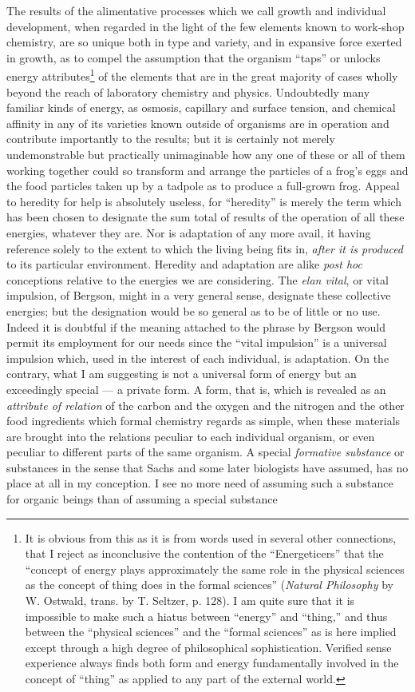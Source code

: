 \documentclass[a4paper, 11pt, oneside, polutonikogreek, english, landscape]{article}
\begin{document}
The results of the alimentative processes which we call growth and individual development, when regarded in the light of the few elements known to work-shop chemistry, are so unique both in type and variety, and in expansive force exerted in growth, as to compel the assumption that the organism ``taps'' or unlocks energy attributes\footnote{It is obvious from this as it is from words used in several other connections, that I reject as inconclusive the contention of the ``Energeticers'' that the ``concept of energy plays approximately the same role in the physical sciences as the concept of thing does in the formal sciences'' (\emph{Natural Philosophy} by W. Ostwald, trans. by T. Seltzer, p. 128). I am quite sure that it is impossible to make such a hiatus between ``energy'' and ``thing,'' and thus between the ``physical sciences'' and the ``formal sciences'' as is here implied except through a high degree of philosophical sophistication. Verified sense experience always finds both form and energy fundamentally involved in the concept of ``thing'' as applied to any part of the external world.} of the elements that are in the great majority of cases wholly beyond the reach of laboratory chemistry and physics. Undoubtedly many familiar kinds of energy, as osmosis, capillary and surface tension, and chemical affinity in any of its varieties known outside of organisms are in operation and contribute importantly to the results; but it is certainly not merely undemonstrable but practically unimaginable how any one of these or all of them working together could so transform and arrange the particles of a frog's eggs and the food particles taken up by a tadpole as to produce a full-grown frog. Appeal to heredity for help is absolutely useless, for ``heredity'' is merely the term which has been chosen to designate the sum total of results of the operation of all these energies, whatever they are. Nor is adaptation of any more avail, it having reference solely to the extent to which the living being fits in, \emph{after it is produced} to its particular environment. Heredity and adaptation are alike \emph{post hoc} conceptions relative to the energies we are considering. The \emph{elan vital}, or vital impulsion, of Bergson, might in a very general sense, designate these collective energies; but the designation would be so general as to be of little or no use. Indeed it is doubtful if the meaning attached to the phrase by Bergson would permit its employment for our needs since the ``vital impulsion'' is a universal impulsion which, used in the interest of each individual, is adaptation. On the contrary, what I am suggesting is not a universal form of energy but an exceedingly special --- a private form. A form, that is, which is revealed as an \emph{attribute of relation} of the carbon and the oxygen and the nitrogen and the other food ingredients which formal chemistry regards as simple, when these materials are brought into the relations peculiar to each individual organism, or even peculiar to different parts of the same organism. A special \emph{formative substance} or substances in the sense that Sachs and some later biologists have assumed, has no place at all in my conception. I see no more need of assuming such a substance for organic beings than of assuming a special substance 
\end{document}
